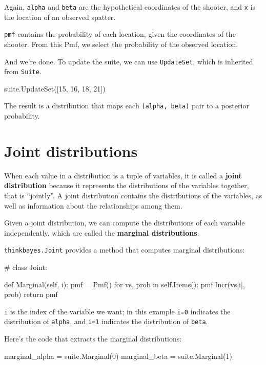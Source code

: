 \documentclass[12pt]{book}
\theoremstyle{exercise}
\begin{document}
Again, {\tt alpha} and {\tt beta} are the hypothetical coordinates of
the shooter, and {\tt x} is the location of an observed spatter.

{\tt pmf} contains the probability of each location, given the
coordinates of the shooter.  From this Pmf, we select the probability
of the observed location.

And we're done.  To update the suite, we can use {\tt UpdateSet},
which is inherited from {\tt Suite}.

\begin{code}
suite.UpdateSet([15, 16, 18, 21])
\end{code}

The result is a distribution that maps each {\tt (alpha, beta)} pair
to a posterior probability.


\section{Joint distributions}

When each value in a distribution is a tuple of variables, it is
called a {\bf joint distribution} because it represents the
distributions of the variables together, that is ``jointly''.
A joint distribution contains the distributions of the variables,
as well as information about the relationships among them.

Given a joint distribution, we can compute the distributions
of each variable independently, which are called the {\bf marginal
distributions}.

{\tt thinkbayes.Joint} provides a method that computes marginal
distributions:

\begin{code}
# class Joint:

    def Marginal(self, i):
        pmf = Pmf()
        for vs, prob in self.Items():
            pmf.Incr(vs[i], prob)
        return pmf
\end{code}

{\tt i} is the index of the variable we want; in this example
{\tt i=0} indicates the distribution of {\tt alpha}, and
{\tt i=1} indicates the distribution of {\tt beta}.

Here's the code that extracts the marginal distributions:

\begin{code}
    marginal_alpha = suite.Marginal(0)
    marginal_beta = suite.Marginal(1)
\end{code}
\end{document}
